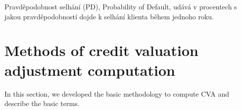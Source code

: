 \documentclass[a4paper,12pt]{report}
\theoremstyle{definition} \newtheorem{definice}[veta]{Definice}
\theoremstyle{remark}
\begin{document}
Pravděpodobnost selhání (PD), Probability of Default, udává v procentech s jakou pravděpodobností dojde k selhání klienta během jednoho roku.

\section{Methods of credit valuation adjustment computation} \label{metodyCVA}
In this section, we developed the basic methodology to compute CVA and describe the basic terms.
\end{document}
